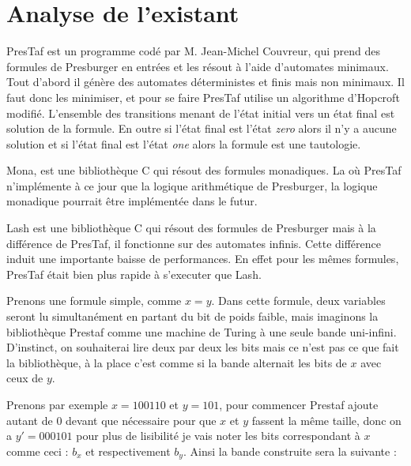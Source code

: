 \section{Analyse de l'existant}

PresTaf est un programme codé par M. Jean-Michel Couvreur, qui prend des formules de Presburger en entrées et les résout à l'aide d'automates minimaux. Tout d'abord il génère des automates déterministes et finis mais non minimaux. Il faut donc les minimiser, et pour se faire PresTaf utilise un algorithme d'Hopcroft modifié. L'ensemble des transitions menant de l'état initial vers un état final est solution de la formule. En outre si l'état final est l'état \emph{zero} alors il n'y a aucune solution et si l'état final est l'état \emph{one} alors la formule est une tautologie.\\\par

Mona, est une bibliothèque C qui résout des formules monadiques. La où PresTaf n'implémente à ce jour que la logique arithmétique de Presburger, la logique monadique pourrait être implémentée dans le futur.\\\par

Lash\cite{lash} est une bibliothèque C qui résout des formules de Presburger mais à la différence de PresTaf, il fonctionne sur des automates infinis. Cette différence induit une importante baisse de performances. En effet pour les mêmes formules, PresTaf était bien plus rapide à s'executer que Lash\cite{DBLP:conf/wia/Couvreur04}.\\\par

Prenons une formule simple, comme $x = y$. Dans cette formule, deux variables seront lu simultanément en partant du bit de poids faible, mais imaginons la bibliothèque Prestaf comme une machine de Turing à une seule bande uni-infini. D'instinct, on souhaiterai lire deux par deux les bits mais ce n'est pas ce que fait la bibliothèque, à la place c'est comme si la bande alternait les bits de $x$ avec ceux de $y$.\\\par
Prenons par exemple $x = 100110$ et $y = 101$, pour commencer Prestaf ajoute autant de 0 devant que nécessaire pour que $x$ et $y$ fassent la même taille, donc on a $y'=000101$ pour plus de lisibilité je vais noter les bits correspondant à $x$ comme ceci : $b_x$ et respectivement $b_y$. Ainsi la bande construite sera la suivante :

